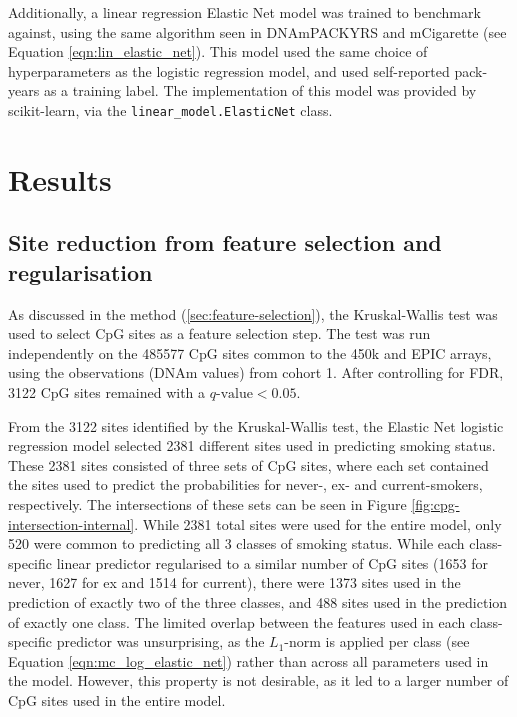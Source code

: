 \documentclass[draft]{article} %
\begin{document}
Additionally, a linear regression Elastic Net model was trained to benchmark against, using the same algorithm seen in DNAmPACKYRS and mCigarette (see Equation \ref{eqn:lin_elastic_net}). This model used the same choice of hyperparameters as the logistic regression model, and used self-reported pack-years as a training label. The implementation of this model was provided by scikit-learn, via the \verb|linear_model.ElasticNet| class.

\newpage
\section{Results} \label{sec:results}

\subsection{Site reduction from feature selection and regularisation}
As discussed in the method (\ref{sec:feature-selection}), the Kruskal-Wallis test was used to select CpG sites as a feature selection step. The test was run independently on the \num{485577} CpG sites common to the 450k and EPIC arrays, using the observations (DNAm values) from cohort 1. After controlling for FDR, \num{3122} CpG sites remained with a \(q\text{-value} < 0.05\).

From the \num{3122} sites identified by the Kruskal-Wallis test, the Elastic Net logistic regression model selected \num{2381} different sites used in predicting smoking status. These \num{2381} sites consisted of three sets of CpG sites, where each set contained the sites used to predict the probabilities for never-, ex- and current-smokers, respectively.
The intersections of these sets can be seen in Figure \ref{fig:cpg-intersection-internal}. While \num{2381} total sites were used for the entire model, only \num{520} were common to predicting all 3 classes of smoking status. While each class-specific linear predictor regularised to a similar number of CpG sites (\num{1653} for never, \num{1627} for ex and \num{1514} for current), there were \num{1373} sites used in the prediction of exactly two of the three classes, and \num{488} sites used in the prediction of exactly one class. The limited overlap between the features used in each class-specific predictor was unsurprising, as the \(L_1\)-norm is applied per class (see Equation \ref{eqn:mc_log_elastic_net}) rather than across all parameters used in the model. However, this property is not desirable, as it led to a larger number of CpG sites used in the entire model.
\end{document}
